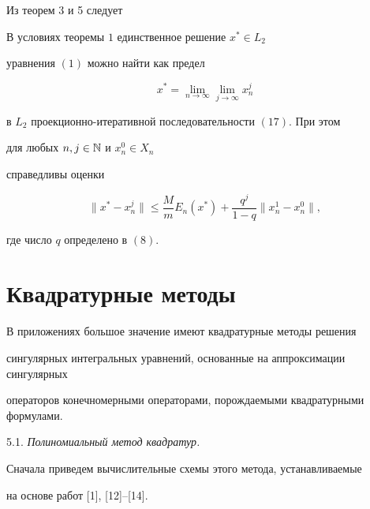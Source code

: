Из теорем 3 и 5 следует





\begin{thm}


В условиях теоремы $1$ единственное решение $x^\ast \in L_2$


уравнения $(1)$ можно найти как предел


$$


x^\ast =\lim_{n\rightarrow \infty } \lim_{j\rightarrow \infty }


x_n^j


$$


в $L_2$ проекционно-итеративной последовательности $(17)$. При этом


для любых $n, j\in \Bbb N$ и $x_n^0\in X_n$


справедливы оценки


\begin{equation}


\|x^\ast -x_n^j\|\leq \frac{M}{m}E_n(x^\ast)+


\frac{q^j}{1-q}\|x_n^1-x_n^0\|,


\end{equation}


где число $q$ определено в $(8)$.


\end{thm}





\section{Квадратурные методы}





В приложениях большое значение имеют квадратурные методы решения


сингулярных интегральных уравнений, основанные на аппроксимации сингулярных


операторов конечномерными операторами, порождаемыми квадратурными формулами.


\medskip





5.1. {\it Полиномиальный метод квадратур.}


Сначала приведем вычислительные схемы этого метода, устанавливаемые


на основе работ [1], [12]--[14].





